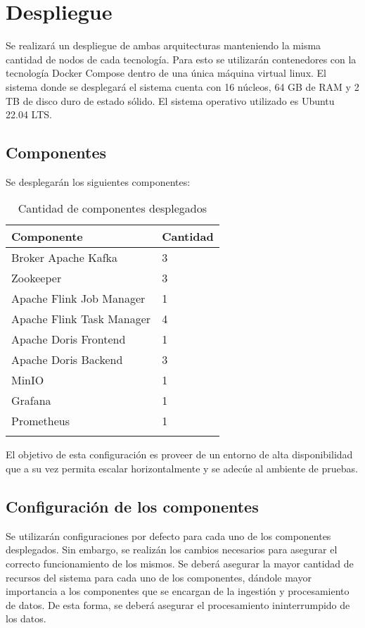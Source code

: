 \section{Despliegue}

Se realizará un despliegue de ambas arquitecturas manteniendo la misma cantidad de nodos de cada tecnología.
Para esto se utilizarán contenedores con la tecnología Docker Compose dentro de una única máquina virtual linux.
El sistema donde se desplegará el sistema cuenta con 16 núcleos, 64 GB de RAM y 2 TB de disco duro de estado sólido.
El sistema operativo utilizado es Ubuntu 22.04 LTS.

\subsection{Componentes}

Se desplegarán los siguientes componentes: 

\begin{longtable}{|p{6cm}|p{6cm}|}
    \hline
    \textbf{Componente} & \textbf{Cantidad} \\
    \hline
    \endhead
    Broker Apache Kafka & 3 \\ 
    \hline
    Zookeeper & 3 \\ 
    \hline
    Apache Flink Job Manager & 1 \\ 
    \hline
    Apache Flink Task Manager & 4 \\ 
    \hline
    Apache Doris Frontend & 1 \\ 
    \hline
    Apache Doris Backend & 3 \\ 
    \hline
    MinIO & 1 \\ 
    \hline
    Grafana & 1 \\ 
    \hline
    Prometheus & 1 \\ 
    \hline 
    \caption{Cantidad de componentes desplegados}
    \label{tab:deployed_components}
\end{longtable}

El objetivo de esta configuración es proveer de un entorno de alta disponibilidad que a su vez permita escalar horizontalmente y
se adecúe al ambiente de pruebas.

\newpage

\subsection{Configuración de los componentes}

Se utilizarán configuraciones por defecto para cada uno de los componentes desplegados.
Sin embargo, se realizán los cambios necesarios para asegurar el correcto funcionamiento de los mismos.
Se deberá asegurar la mayor cantidad de recursos del sistema para cada uno de los componentes,
dándole mayor importancia a los componentes que se encargan de la ingestión y procesamiento de datos.
De esta forma, se deberá asegurar el procesamiento ininterrumpido de los datos.